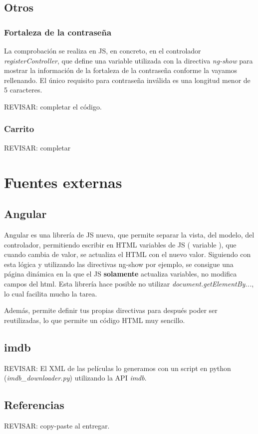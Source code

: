 \documentclass{apuntes}
\begin{document}
\subsection{Otros}

\subsubsection{Fortaleza de la contraseña}
\label{PasStrength}

La comprobación se realiza en JS, en concreto, en el controlador \textit{registerController}, que define una variable utilizada con la directiva \textit{ng-show} para mostrar la información de la fortaleza de la contraseña conforme la vayamos rellenando. El único requisito para contraseña inválida es una longitud menor de 5 caracteres.

REVISAR: completar el código.

\subsubsection{Carrito}

REVISAR: completar

\section{Fuentes externas}

\subsection{Angular}
\label{Angular}

Angular es una librería de JS nueva, que permite separar la vista, del modelo, del controlador, permitiendo escribir en HTML variables de JS ( {{variable }}), que cuando cambia de valor, se actualiza el HTML con el nuevo valor. Siguiendo con esta lógica y utilizando las directivas ng-show por ejemplo, se consigue una página dinámica en la que el JS \textbf{solamente} actualiza variables, no modifica campos del html. Esta librería hace posible no utilizar \textit{document.getElementBy...}, lo cual facilita mucho la tarea.

Además, permite definir tus propias directivas para después poder ser reutilizadas, lo que permite un código HTML muy sencillo.

\subsection{imdb}

REVISAR: El XML de las películas lo generamos con un script en python (\textit{imdb\_downloader.py}) utilizando la API \textit{imdb}. 


\subsection{Referencias}

REVISAR: copy-paste al entregar.
\end{document}

